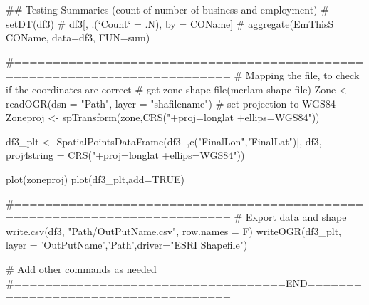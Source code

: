 ## Testing Summaries (count of number of business and employment)
# setDT(df3)
# df3[, .(`Count` = .N), by = COName]
# aggregate(EmThisS ~ COName, data=df3, FUN=sum)

#==========================================================================
# Mapping the file,  to check if the coordinates are correct
# get zone shape file(merlam shape file)
Zone <- readOGR(dsn = "Path", layer = "shafilename") 
# set projection to WGS84
Zoneproj <- spTransform(zone,CRS("+proj=longlat +ellips=WGS84"))


df3_plt <- SpatialPointsDataFrame(df3[ ,c("FinalLon","FinalLat")], df3,
                                   proj4string = CRS("+proj=longlat +ellips=WGS84"))

plot(zoneproj)
plot(df3_plt,add=TRUE)
							   
#==========================================================================
# Export data and shape
write.csv(df3, "Path/OutPutName.csv", row.names = F)
writeOGR(df3_plt, layer = 'OutPutName','Path',driver="ESRI Shapefile")

# Add other commands as needed
#===================================END====================================
